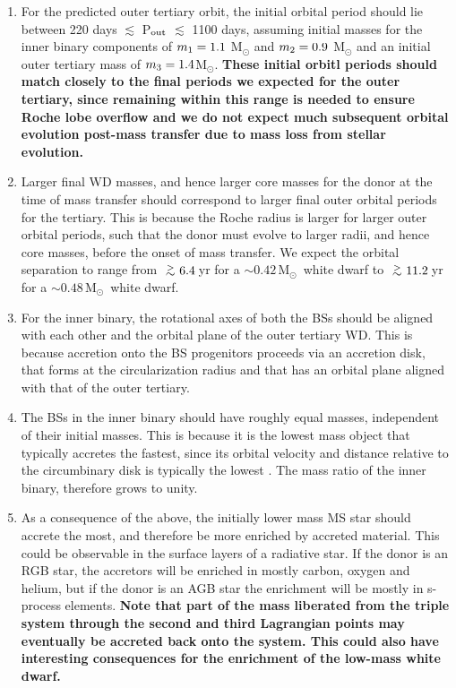 \documentclass[twocolumn]{aastex62}
\newcommand{\MSun}{\mbox{M$_\odot$}}
\def\apgt{\ {\raise-.5ex\hbox{$\buildrel>\over\sim$}}\ }
\begin{document}
\begin{enumerate}

\item For the predicted outer tertiary orbit, the initial orbital
  period should lie between 220 days $\lesssim$ P$_{\rm out}$
  $\lesssim$ 1100 days, assuming initial masses for the inner binary
  components of $m_{\rm 1} = 1.1$ M$_{\odot}$ and $m_{\rm 2} = 0.9$
  M$_{\odot}$ and an initial outer tertiary mass of $m_{\rm 3} = 1.4          
  $M$_{\odot}$.  \textbf{These initial orbitl periods should match closely to the final periods we expected for the outer tertiary, since remaining within this range is needed to ensure Roche lobe overflow and we do not expect much subsequent orbital evolution post-mass transfer due to mass loss from stellar evolution.}

\item Larger final WD masses, and hence larger core masses for the
  donor at the time of mass transfer should correspond to larger final
  outer orbital periods for the tertiary.  This is because the Roche
  radius is larger for larger outer orbital periods, such that the
  donor must evolve to larger radii, and hence core masses, before the
  onset of mass transfer. We expect the orbital separation to range
  from $\apgt 6.4$\,yr for a $\sim 0.42$\,\MSun\, white dwarf to
  $\apgt 11.2$\,yr for a $\sim 0.48$\,\MSun\, white dwarf.

\item For the inner binary, the rotational axes of both the BSs should
  be aligned with each other and the orbital plane of the outer
  tertiary WD.  This is because accretion onto the BS progenitors
  proceeds via an accretion disk, that forms at the circularization
  radius and that has an orbital plane aligned with that of the outer
  tertiary.

\item The BSs in the inner binary should have roughly equal masses,
  independent of their initial masses.  This is because it is the
  lowest mass object that typically accretes the fastest, since its
  orbital velocity and distance relative to the circumbinary disk is
  typically the lowest
  \citep[e.g.][]{2000MNRAS.314...33B,2012ApJ...749..118S,2017MNRAS.466.1170M}.
  The mass ratio of the inner binary, therefore grows to unity.  

\item As a consequence of the above, the initially lower mass MS star should accrete the
  most, and therefore be more enriched by accreted material.  This
  could be observable in the surface layers of a radiative star.  If
  the donor is an RGB star, the accretors will be enriched in mostly
  carbon, oxygen and helium, but if the donor is an AGB star the
  enrichment will be mostly in s-process elements.  \textbf{Note that part of the
  mass liberated from the triple system through the second and third
  Lagrangian points may eventually be accreted back onto the system.
  This could also have interesting consequences for the enrichment of the
  low-mass white dwarf.}


\end{enumerate}
\end{document}
